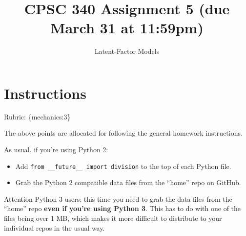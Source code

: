 \documentclass{article}
\begin{document}
\def\blu#1{{\color{blu}#1}}
\def\gre#1{{\color{gre}#1}}
\def\red#1{{\color{red}#1}}
\def\norm#1{\|#1\|}
\newcommand{\argmin}[1]{\mathop{\hbox{argmin}}_{#1}}
\newcommand{\argmax}[1]{\mathop{\hbox{argmax}}_{#1}}
\def\R{\mathbb{R}}
\newcommand{\fig}[2]{\texttt{[image: \#2]}}
\newcommand{\centerfig}[2]{\begin{center}\texttt{[image: \#2]}\end{center}}
\def\items#1{\begin{itemize}#1\end{itemize}}
\def\enum#1{\begin{enumerate}#1\end{enumerate}}
\newcommand{\code}[1]{}
\newcommand{\half}{\frac 1 2}
\def\argmax{\mathop{\rm arg\,max}}
\def\argmin{\mathop{\rm arg\,min}}
\def\rubric#1{\gre{Rubric: \{#1\}}}{}


\title{CPSC 340 Assignment 5 (due March 31 at 11:59pm)}
\author{Latent-Factor Models}
\date{}
\maketitle

\section*{Instructions}
\rubric{mechanics:3}

The above points are allocated for following the general homework instructions.

\vspace{1em}

As usual, if you're using Python 2:
\begin{itemize}
  \item Add \verb|from __future__ import division| to the top of each Python file. 
  \item Grab the Python 2 compatible data files from the ``home'' repo on GitHub.
\end{itemize}

\vspace{1em}
Attention Python 3 users: this time you need to grab the data files from the ``home'' repo 
\textbf{even if you're using Python 3}. This has to do with one of the files being over 1 MB, 
which makes it more difficult to distribute to your individual repos in the usual way.
\end{document}
